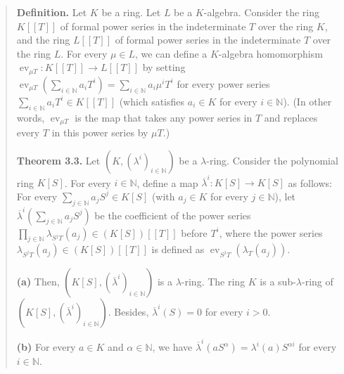 \documentclass[12pt,final,notitlepage,onecolumn,german]{article}%
\begin{document}
\begin{quote}
\textbf{Definition.} Let $K$ be a ring. Let $L$ be a $K$-algebra. Consider the
ring $K\left[  \left[  T\right]  \right]  $ of formal power series in the
indeterminate $T$ over the ring $K$, and the ring $L\left[  \left[  T\right]
\right]  $ of formal power series in the indeterminate $T$ over the ring $L$.
For every $\mu\in L$, we can define a $K$-algebra homomorphism
$\operatorname*{ev}_{\mu T}:K\left[  \left[  T\right]  \right]  \rightarrow
L\left[  \left[  T\right]  \right]  $ by setting $\operatorname*{ev}_{\mu
T}\left(  \sum\limits_{i\in\mathbb{N}}a_{i}T^{i}\right)  =\sum\limits_{i\in
\mathbb{N}}a_{i}\mu^{i}T^{i}$ for every power series $\sum\limits_{i\in
\mathbb{N}}a_{i}T^{i}\in K\left[  \left[  T\right]  \right]  $ (which
satisfies $a_{i}\in K$ for every $i\in\mathbb{N}$). (In other words,
$\operatorname*{ev}_{\mu T}$ is the map that takes any power series in $T$ and
replaces every $T$ in this power series by $\mu T$.)

\textbf{Theorem 3.3.} Let $\left(  K,\left(  \lambda^{i}\right)
_{i\in\mathbb{N}}\right)  $ be a $\lambda$-ring. Consider the polynomial ring
$K\left[  S\right]  $. For every $i\in\mathbb{N}$, define a map $\overline
{\lambda}^{i}:K\left[  S\right]  \rightarrow K\left[  S\right]  $ as follows:
For every $\sum\limits_{j\in\mathbb{N}}a_{j}S^{j}\in K\left[  S\right]  $
(with $a_{j}\in K$ for every $j\in\mathbb{N}$), let $\overline{\lambda}%
^{i}\left(  \sum\limits_{j\in\mathbb{N}}a_{j}S^{j}\right)  $ be the
coefficient of the power series $\prod\limits_{j\in\mathbb{N}}\lambda_{S^{j}%
T}\left(  a_{j}\right)  \in\left(  K\left[  S\right]  \right)  \left[  \left[
T\right]  \right]  $ before $T^{i}$, where the power series $\lambda_{S^{j}%
T}\left(  a_{j}\right)  \in\left(  K\left[  S\right]  \right)  \left[  \left[
T\right]  \right]  $ is defined as $\operatorname*{ev}_{S^{j}T}\left(
\lambda_{T}\left(  a_{j}\right)  \right)  $.

\textbf{(a)} Then, $\left(  K\left[  S\right]  ,\left(  \overline{\lambda}%
^{i}\right)  _{i\in\mathbb{N}}\right)  $ is a $\lambda$-ring. The ring $K$ is
a sub-$\lambda$-ring of $\left(  K\left[  S\right]  ,\left(  \overline
{\lambda}^{i}\right)  _{i\in\mathbb{N}}\right)  $. Besides, $\overline
{\lambda}^{i}\left(  S\right)  =0$ for every $i>0$.

\textbf{(b)} For every $a\in K$ and $\alpha\in\mathbb{N}$, we have
$\overline{\lambda}^{i}\left(  aS^{\alpha}\right)  =\lambda^{i}\left(
a\right)  S^{\alpha i}$ for every $i\in\mathbb{N}$.
\end{quote}
\end{document}
